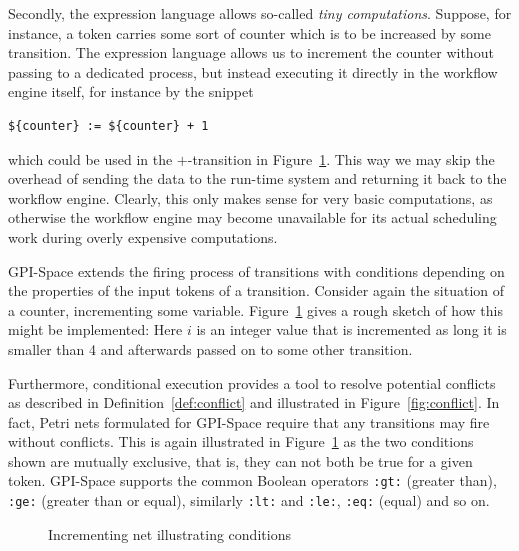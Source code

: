 \documentclass[
  paper=a4,
  titlepage,
  bibliography=totoc,
  pagesize=pdftex
]{scrartcl}
\numberwithin{figure}{section}
\numberwithin{equation}{section}
\numberwithin{table}{section}
\theoremstyle{definition}
\numberwithin{definition}{section}
\begin{document}
\begin{description}[leftmargin=\parindent]
    Secondly, the expression language allows so-called \emph{tiny computations}. Suppose,
    for instance, a token carries some sort of counter which is to be increased by some
    transition. The expression language allows us to increment the counter without passing
    to a dedicated process, but instead executing it directly in the workflow engine
    itself, for instance by the snippet
    \begin{verbatim}${counter} := ${counter} + 1\end{verbatim}
    which could be used in the $+$-transition in Figure~\ref{fig:inc}. This way we may skip
    the overhead of sending the data to the run-time system and returning it back to the
    workflow engine. Clearly, this only makes sense for very basic computations, as
    otherwise the workflow engine may become unavailable for its actual scheduling work
    during overly expensive computations.
  \item[Conditions:] GPI-Space extends the firing process of transitions with conditions
    depending on the properties of the input tokens of a transition. Consider again the
    situation of a counter, incrementing some variable. Figure~\ref{fig:inc} gives a rough
    sketch of how this might be implemented: Here $i$ is an integer value that is
    incremented as long it is smaller than 4 and afterwards passed on to some other
    transition.

    Furthermore, conditional execution provides a tool to resolve potential conflicts as
    described in Definition~\ref{def:conflict} and illustrated in
    Figure~\ref{fig:conflict}. In fact, Petri nets formulated for GPI-Space require that
    any transitions may fire without conflicts. This is again illustrated in
    Figure~\ref{fig:inc} as the two conditions shown are mutually exclusive, that is, they
    can not both be true for a given token. GPI-Space supports the common Boolean
    operators \texttt{:gt:} (greater than), \texttt{:ge:} (greater than or equal),
    similarly \texttt{:lt:} and \texttt{:le:}, \texttt{:eq:} (equal) and so on.
\end{description}

\begin{figure}[htbp]
  \centering
  \caption{Incrementing net illustrating conditions}
  \label{fig:inc}
\end{figure}
\end{document}
